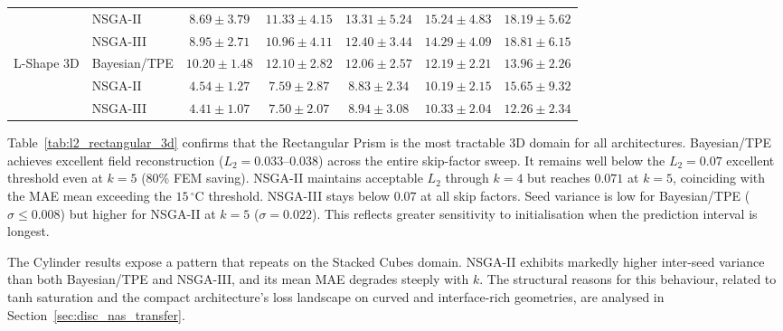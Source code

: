 \begin{table}[H]
\begin{tabular}{@{}llccccc@{}}
  & NSGA-II      & \cellcolor{RoyalBlue!20}$8.69\pm3.79$ & \cellcolor{RoyalBlue!20}$11.33\pm4.15$ & \cellcolor{RoyalBlue!20}$13.31\pm5.24$ & {\color{gray!60!black}$15.24\pm4.83$} & {\color{gray!60!black}$18.19\pm5.62$} \\
  & NSGA-III     & \cellcolor{RoyalBlue!20}$8.95\pm2.71$ & \cellcolor{RoyalBlue!20}$10.96\pm4.11$ & \cellcolor{RoyalBlue!20}$12.40\pm3.44$ & \cellcolor{RoyalBlue!20}$14.29\pm4.09$ & {\color{gray!60!black}$18.81\pm6.15$} \\
\midrule
\multirow{3}{*}{L-Shape 3D}
  & Bayesian/TPE & \cellcolor{RoyalBlue!20}$10.20\pm1.48$ & \cellcolor{RoyalBlue!20}$12.10\pm2.82$ & \cellcolor{RoyalBlue!20}$12.06\pm2.57$ & \cellcolor{RoyalBlue!20}$12.19\pm2.21$ & \cellcolor{RoyalBlue!20}$13.96\pm2.26$ \\
  & NSGA-II      & \cellcolor{RoyalBlue!20}$4.54\pm1.27$ & \cellcolor{RoyalBlue!20}$7.59\pm2.87$ & \cellcolor{RoyalBlue!20}$8.83\pm2.34$ & \cellcolor{RoyalBlue!20}$10.19\pm2.15$ & {\color{gray!60!black}$15.65\pm9.32$} \\
  & NSGA-III     & \cellcolor{RoyalBlue!20}$4.41\pm1.07$ & \cellcolor{RoyalBlue!20}$7.50\pm2.07$ & \cellcolor{RoyalBlue!20}$8.94\pm3.08$ & \cellcolor{RoyalBlue!20}$10.33\pm2.04$ & \cellcolor{RoyalBlue!20}$12.26\pm2.34$ \\
\bottomrule
\end{tabular}
\end{table}

Table~\ref{tab:l2_rectangular_3d} confirms that the Rectangular Prism is the
most tractable 3D domain for all architectures. Bayesian/TPE achieves
excellent field reconstruction ($L_2 = 0.033$--$0.038$) across the entire
skip-factor sweep. It remains well below the $L_2=0.07$ excellent threshold
even at $k=5$ (80\% FEM saving). NSGA-II maintains acceptable $L_2$ through
$k=4$ but reaches $0.071$ at $k=5$, coinciding with the MAE mean exceeding the
$15\,^\circ\mathrm{C}$ threshold. NSGA-III stays below $0.07$ at all skip
factors. Seed variance is low for Bayesian/TPE ($\sigma \leq 0.008$) but
higher for NSGA-II at $k=5$ ($\sigma=0.022$). This reflects greater sensitivity
to initialisation when the prediction interval is longest.

The Cylinder results expose a pattern that repeats on the Stacked Cubes
domain. NSGA-II exhibits markedly higher inter-seed variance than both
Bayesian/TPE and NSGA-III, and its mean MAE degrades steeply with $k$.
The structural reasons for this behaviour, related to tanh saturation and the
compact architecture's loss landscape on curved and interface-rich geometries,
are analysed in Section~\ref{sec:disc_nas_transfer}.

